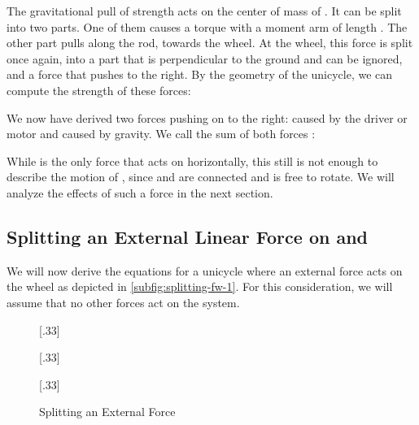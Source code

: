 \documentclass[copyright,submission]{eptcs}
\newcommand{\surface}{
    \begin{scope}[transparency group]
        \clip (-2,0) rectangle (2,-1);
        \draw[scope fading=south] (-2,0) rectangle (2,-1);
        \foreach \x in {-2,-1.75,...,3}
            \draw (\x,0) -- ();
    \end{scope}
}
\newcommand{\wheel}{
    \draw (0, 1) circle (1);
    \draw[fill] (0, 1) circle (0.05);
}
\newcommand{\saddle}[1][110]{
    \draw (0, 1) -- ([shift=(#1:3)] 0,1);
    \draw[fill] ([shift=(#1:0)] 0,1) circle (0.05);
    \draw[fill] ([shift=(#1:2)] 0,1) circle (0.03);
    \draw[fill] ([shift=(#1:3)] 0,1) circle (0.05);
}
\newcommand{\angletheta}[1][110]{
    \draw[dashed] (0, 1) -- (0, 3);
    \draw[dashed] ([shift=(90:1.5)] 0,1) arc (90:#1:1.5) node [midway, below] {};
}
\begin{document}
The gravitational pull of strength  acts on the center of mass of . It can be split into two parts. One of them causes a torque  with a moment arm of length . The other part pulls along the rod, towards the wheel. At the wheel, this force is split once again, into a part that is perpendicular to the ground and can be ignored, and a force  that pushes  to the right. By the geometry of the unicycle, we can compute the strength of these forces:


We now have derived two forces pushing on  to the right:  caused by the driver or motor and  caused by gravity. We call the sum of both forces :


While  is the only force that acts on  horizontally, this still is not enough to describe the motion of , since  and  are connected and  is free to rotate. We will analyze the effects of such a force in the next section.


\subsection{Splitting an External Linear Force on \texorpdfstring{}{W} and \texorpdfstring{}{S}}\label{sct:splitting-fw}

We will now derive the equations for a unicycle where an external force  acts on the wheel as depicted in \cref{subfig:splitting-fw-1}. For this consideration, we will assume that no other forces act on the system.

\begin{figure}\centering
    [.33\linewidth]{
        \centering{}
    }[.33\linewidth]{
        \centering{}
    }[.33\linewidth]{
        \centering{}
    }
    \caption{\label{fig:splitting-fw} Splitting an External Force}
\end{figure}
\end{document}
